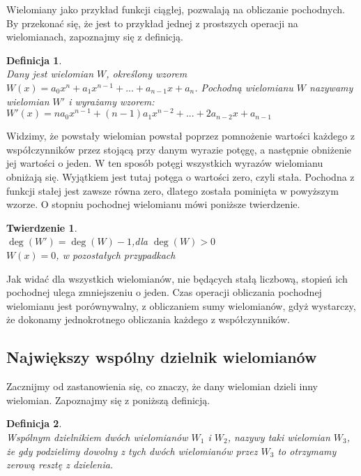 \documentclass[oneside,a4paper]{book}
\newtheorem{theorem}{Twierdzenie}
\newtheorem{definition}{Definicja}
\begin{document}
	Wielomiany jako przykład funkcji ciągłej, pozwalają na obliczanie pochodnych. By przekonać się, że jest to przykład jednej z prostszych operacji na wielomianach, zapoznajmy się z definicją.
	
	\begin{definition}
		$ $\\
		Dany jest wielomian $W$, określony wzorem $W(x) = a_0x^n + a_1x^{n-1} + ... + a_{n-1}x + a_n$. Pochodną wielomianu $W$ nazywamy wielomian $W'$ i wyrażamy wzorem:
		$W'(x) = na_0x^{n-1} + (n-1)a_1x^{n-2} + ... + 2a_{n-2}x + a_{n-1}$
	\end{definition}
	
	Widzimy, że powstały wielomian powstał poprzez pomnożenie wartości każdego z współczynników przez stojącą przy danym wyrazie potęgę, a następnie obniżenie jej wartości o jeden. W ten sposób potęgi wszystkich wyrazów wielomianu obniżają się. Wyjątkiem jest tutaj potęga o wartości zero, czyli stała. Pochodna z funkcji stałej jest zawsze równa zero, dlatego została pominięta w powyższym wzorze. O stopniu pochodnej wielomianu mówi poniższe twierdzenie.
	
	\begin{theorem}
		$ $\\
		$\deg(W') = \deg(W) - 1$,dla $\deg(W) > 0$ \\
		$W(x) = 0$, w pozostałych przypadkach
	\end{theorem}
	
	Jak widać dla wszystkich wielomianów, nie będących stałą liczbową, stopień ich pochodnej ulega zmniejszeniu o jeden. Czas operacji obliczania pochodnej wielomianu jest porównywalny, z obliczaniem sumy wielomianów, gdyż wystarczy, że dokonamy jednokrotnego obliczania każdego z współczynników.
	
	\subsection{Największy wspólny dzielnik wielomianów}
	
	Zacznijmy od zastanowienia się, co znaczy, że dany wielomian dzieli inny wielomian. Zapoznajmy się z poniższą definicją.
	
	\begin{definition}
		$ $\\
		Wspólnym dzielnikiem dwóch wielomianów $W_1$ i $W_2$, nazywy taki wielomian $W_3$, że gdy podzielimy dowolny z tych dwóch wielomianów przez $W_3$ to otrzymamy zerową resztę z dzielenia.
	\end{definition}
	
\end{document}
